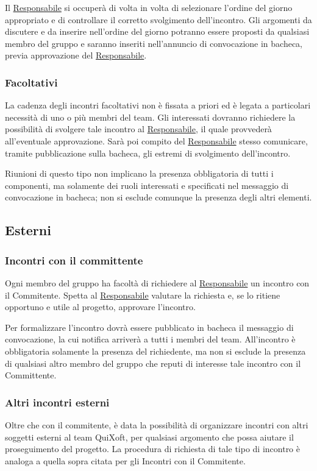 \documentclass[11pt,a4paper]{article}
\begin{document}
Il \underline{Responsabile} si occuperà di volta in volta di selezionare l'ordine del giorno appropriato e di controllare il corretto svolgimento dell'incontro.
Gli argomenti da discutere e da inserire nell'ordine del giorno potranno essere proposti da qualsiasi membro del gruppo e saranno inseriti nell'annuncio di convocazione in bacheca, previa approvazione del \underline{Responsabile}.
\subsubsection{Facoltativi}
La cadenza degli incontri facoltativi non è fissata a priori ed è legata a particolari necessità di uno o più membri del team.
Gli interessati dovranno richiedere la possibilità di svolgere tale incontro al \underline{Responsabile}, il quale provvederà all'eventuale approvazione.
Sarà poi compito del \underline{Responsabile} stesso comunicare, tramite pubblicazione sulla bacheca, gli estremi di svolgimento dell'incontro.

Riunioni di questo tipo non implicano la presenza obbligatoria di tutti i componenti, ma solamente dei ruoli interessati e specificati nel messaggio di convocazione in bacheca; non si esclude comunque la presenza degli altri elementi.
\subsection{Esterni}
\subsubsection{Incontri con il committente}
Ogni membro del gruppo ha facoltà di richiedere al \underline{Responsabile} un incontro con il Commitente.
Spetta al \underline{Responsabile} valutare la richiesta e, se lo ritiene opportuno e utile al progetto, approvare l'incontro.

Per formalizzare l'incontro dovrà essere pubblicato in bacheca il messaggio di convocazione, la cui notifica arriverà a tutti i membri del team.
All'incontro è obbligatoria solamente la presenza del richiedente, ma non si esclude la presenza di qualsiasi altro membro del gruppo che reputi di interesse tale incontro con il Committente.
\subsubsection{Altri incontri esterni}
Oltre che con il commitente, è data la possibilità di organizzare incontri con altri soggetti esterni al team QuiXoft, per qualsiasi argomento che possa aiutare il proseguimento del progetto.
La procedura di richiesta di tale tipo di incontro è analoga a quella sopra citata per gli Incontri con il Commitente.
\end{document}
